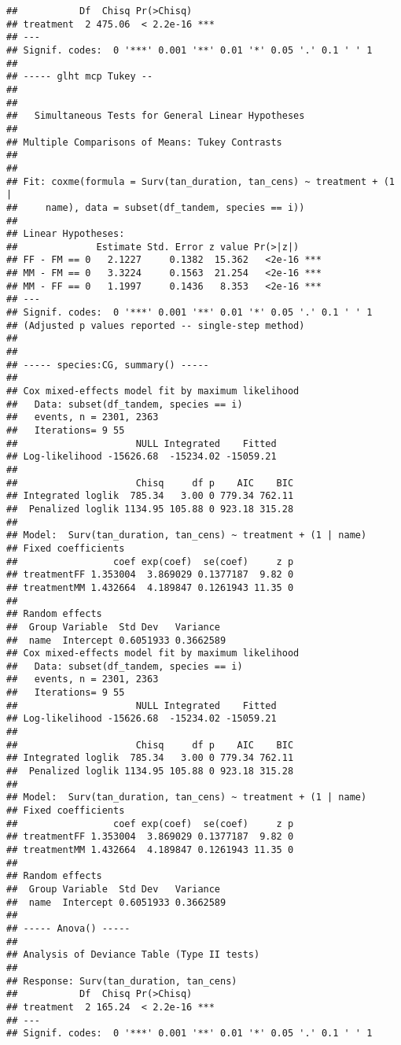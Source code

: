 \documentclass[
]{article}
\begin{document}
\begin{verbatim}
##           Df  Chisq Pr(>Chisq)    
## treatment  2 475.06  < 2.2e-16 ***
## ---
## Signif. codes:  0 '***' 0.001 '**' 0.01 '*' 0.05 '.' 0.1 ' ' 1
## 
## ----- glht mcp Tukey --
## 
## 
##   Simultaneous Tests for General Linear Hypotheses
## 
## Multiple Comparisons of Means: Tukey Contrasts
## 
## 
## Fit: coxme(formula = Surv(tan_duration, tan_cens) ~ treatment + (1 | 
##     name), data = subset(df_tandem, species == i))
## 
## Linear Hypotheses:
##              Estimate Std. Error z value Pr(>|z|)    
## FF - FM == 0   2.1227     0.1382  15.362   <2e-16 ***
## MM - FM == 0   3.3224     0.1563  21.254   <2e-16 ***
## MM - FF == 0   1.1997     0.1436   8.353   <2e-16 ***
## ---
## Signif. codes:  0 '***' 0.001 '**' 0.01 '*' 0.05 '.' 0.1 ' ' 1
## (Adjusted p values reported -- single-step method)
## 
## 
## ----- species:CG, summary() -----
## 
## Cox mixed-effects model fit by maximum likelihood
##   Data: subset(df_tandem, species == i)
##   events, n = 2301, 2363
##   Iterations= 9 55 
##                     NULL Integrated    Fitted
## Log-likelihood -15626.68  -15234.02 -15059.21
## 
##                     Chisq     df p    AIC    BIC
## Integrated loglik  785.34   3.00 0 779.34 762.11
##  Penalized loglik 1134.95 105.88 0 923.18 315.28
## 
## Model:  Surv(tan_duration, tan_cens) ~ treatment + (1 | name) 
## Fixed coefficients
##                 coef exp(coef)  se(coef)     z p
## treatmentFF 1.353004  3.869029 0.1377187  9.82 0
## treatmentMM 1.432664  4.189847 0.1261943 11.35 0
## 
## Random effects
##  Group Variable  Std Dev   Variance 
##  name  Intercept 0.6051933 0.3662589
## Cox mixed-effects model fit by maximum likelihood
##   Data: subset(df_tandem, species == i)
##   events, n = 2301, 2363
##   Iterations= 9 55 
##                     NULL Integrated    Fitted
## Log-likelihood -15626.68  -15234.02 -15059.21
## 
##                     Chisq     df p    AIC    BIC
## Integrated loglik  785.34   3.00 0 779.34 762.11
##  Penalized loglik 1134.95 105.88 0 923.18 315.28
## 
## Model:  Surv(tan_duration, tan_cens) ~ treatment + (1 | name) 
## Fixed coefficients
##                 coef exp(coef)  se(coef)     z p
## treatmentFF 1.353004  3.869029 0.1377187  9.82 0
## treatmentMM 1.432664  4.189847 0.1261943 11.35 0
## 
## Random effects
##  Group Variable  Std Dev   Variance 
##  name  Intercept 0.6051933 0.3662589
## 
## ----- Anova() -----
## 
## Analysis of Deviance Table (Type II tests)
## 
## Response: Surv(tan_duration, tan_cens)
##           Df  Chisq Pr(>Chisq)    
## treatment  2 165.24  < 2.2e-16 ***
## ---
## Signif. codes:  0 '***' 0.001 '**' 0.01 '*' 0.05 '.' 0.1 ' ' 1

\end{verbatim}
\end{document}
